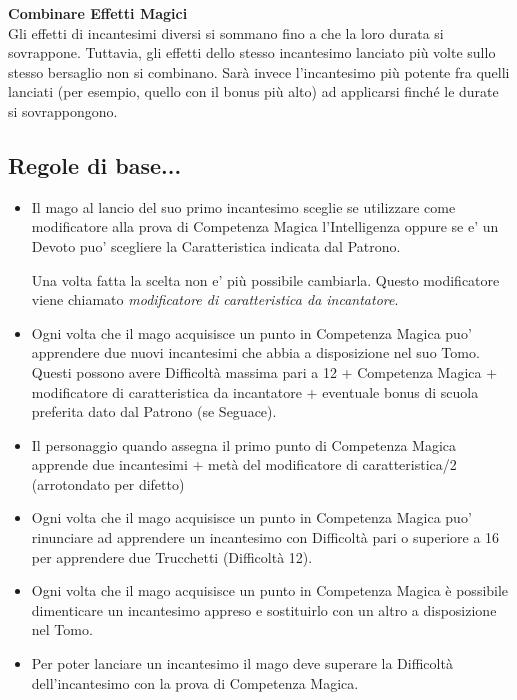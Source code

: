\begin{multicols}{2}
\textbf{Combinare Effetti Magici}\\
Gli effetti di incantesimi diversi si sommano fino a che la loro durata si sovrappone. Tuttavia, gli effetti dello stesso incantesimo lanciato più volte sullo stesso bersaglio non si combinano. Sarà invece l'incantesimo più potente fra quelli lanciati (per esempio, quello con il bonus più alto) ad applicarsi finché le durate si sovrappongono.\\

\subsection{Regole di base...}

\begin{itemize}

\item
Il mago al lancio del suo primo incantesimo sceglie se utilizzare come modificatore alla prova di Competenza Magica l'Intelligenza oppure se e' un Devoto puo' scegliere la Caratteristica indicata dal Patrono.

Una volta fatta la scelta non e' più possibile cambiarla. Questo modificatore viene chiamato \emph{modificatore di caratteristica da incantatore}.
\item 
Ogni volta che il mago acquisisce un punto in Competenza Magica puo' apprendere due nuovi incantesimi che abbia a disposizione nel suo Tomo. Questi possono avere Difficoltà massima pari a 12 + Competenza Magica + modificatore di caratteristica da incantatore + eventuale bonus di scuola preferita dato dal Patrono (se Seguace).
\item
Il personaggio quando assegna il primo punto di Competenza Magica apprende due incantesimi + metà del modificatore di caratteristica/2 (arrotondato per difetto)
\item
Ogni volta che il mago acquisisce un punto in Competenza Magica puo' rinunciare ad apprendere un incantesimo con Difficoltà pari o superiore a 16 per apprendere due Trucchetti (Difficoltà 12).
\item 
Ogni volta che il mago acquisisce un punto in Competenza Magica è possibile dimenticare un incantesimo appreso e sostituirlo con un altro a disposizione nel Tomo.
\item 
Per poter lanciare un incantesimo il mago deve superare la Difficoltà dell'incantesimo con la prova di Competenza Magica.


\end{itemize}
\end{multicols}
